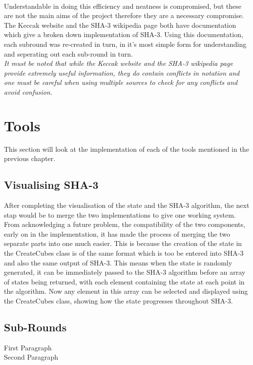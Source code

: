 \vspace{5mm}\\
Understandable in doing this efficiency and neatness is compromised, but these are not the main aims of the project therefore they are a necessary compromise. 
\vspace{5mm}\\
The Keccak website\cite{KeccakSite} and the SHA-3 wikipedia page\cite{SHA3Wiki} both have documentation which give a broken down implementation of SHA-3. Using this documentation, each subround was re-created in turn, in it's most simple form for understanding and seperating out each sub-round in turn.
\vspace{0mm}\\
\textit{It must be noted that while the Keccak website and the SHA-3 wikipedia page provide extremely useful information, they do contain conflicts in notation and one must be careful when using multiple sources to check for any conflicts and avoid confusion.}
\section{Tools}
This section will look at the implementation of each of the tools mentioned in the previous chapter.
\subsection{Visualising SHA-3}
After completing the visualisation of the state and the SHA-3 algorithm, the next stap would be to merge the two implementations to give one working system.
\vspace{5mm}\\
From acknowledging a future problem, the compatibility of the two components, early on in the implementation, it has made the process of merging the two separate parts into one much easier. This is because the creation of the state in the CreateCubes class is of the same format which is too be entered into SHA-3 and also the same output of SHA-3. This means when the state is randomly generated, it can be immediately passed to the SHA-3 algorithm before an array of states being returned, with each element containing the state at each point in the algorithm. Now any element in this array can be selected and displayed using the CreateCubes class, showing how the state progresses throughout SHA-3.
\subsection{Sub-Rounds}
First Paragraph
\vspace{5mm}\\
Second Paragraph
